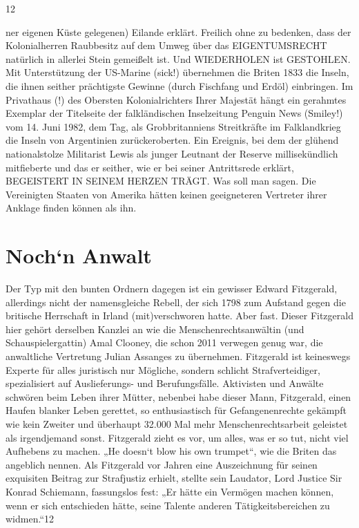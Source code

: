 \begin{multicols}{2}
12

ner eigenen Küste gelegenen) Eilande erklärt. Freilich
ohne zu bedenken, dass der Kolonialherren Raubbesitz
auf dem Umweg über das EIGENTUMSRECHT natürlich
in allerlei Stein gemeißelt ist. Und WIEDERHOLEN ist
GESTOHLEN. Mit Unterstützung der US-Marine (sick!)
übernehmen die Briten 1833 die Inseln, die ihnen seither prächtigste Gewinne (durch Fischfang und Erdöl)
einbringen.
Im Privathaus (!) des Obersten Kolonialrichters Ihrer Majestät hängt ein gerahmtes Exemplar der Titelseite der
falkländischen Inselzeitung Penguin News (Smiley!) vom
14. Juni 1982, dem Tag, als Grobbritanniens Streitkräfte im Falklandkrieg die Inseln von Argentinien zurückeroberten. Ein Ereignis, bei dem der glühend nationalstolze Militarist Lewis als junger Leutnant der Reserve
millisekündlich mitfieberte und das er seither, wie er
bei seiner Antrittsrede erklärt, BEGEISTERT IN SEINEM
HERZEN TRÄGT.
Was soll man sagen. Die Vereinigten Staaten von Amerika hätten keinen geeigneteren Vertreter ihrer Anklage
finden können als ihn.



\chapter{Noch‘n Anwalt} %

Der Typ mit den bunten Ordnern dagegen ist ein gewisser Edward Fitzgerald, allerdings nicht der namensgleiche Rebell, der sich 1798 zum Aufstand gegen die britische Herrschaft in Irland (mit)verschworen hatte. Aber
fast. Dieser Fitzgerald hier gehört derselben Kanzlei an
wie die Menschenrechtsanwältin (und Schauspielergattin) Amal Clooney, die schon 2011 verwegen genug war,
die anwaltliche Vertretung Julian Assanges zu übernehmen.
Fitzgerald ist keineswegs Experte für alles juristisch nur
Mögliche, sondern schlicht Strafverteidiger, spezialisiert
auf Auslieferungs- und Berufungsfälle. Aktivisten und
Anwälte schwören beim Leben ihrer Mütter, nebenbei
habe dieser Mann, Fitzgerald, einen Haufen blanker Leben gerettet, so enthusiastisch für Gefangenenrechte gekämpft wie kein Zweiter und überhaupt 32.000 Mal mehr
Menschenrechtsarbeit geleistet als irgendjemand sonst.
Fitzgerald zieht es vor, um alles, was er so tut, nicht viel
Aufhebens zu machen. „He doesn‘t blow his own trumpet“, wie die Briten das angeblich nennen. Als Fitzgerald vor Jahren eine Auszeichnung für seinen exquisiten
Beitrag zur Strafjustiz erhielt, stellte sein Laudator, Lord
Justice Sir Konrad Schiemann, fassungslos fest: „Er hätte
ein Vermögen machen können, wenn er sich entschieden hätte, seine Talente anderen Tätigkeitsbereichen zu
widmen.“12


\end{multicols}
